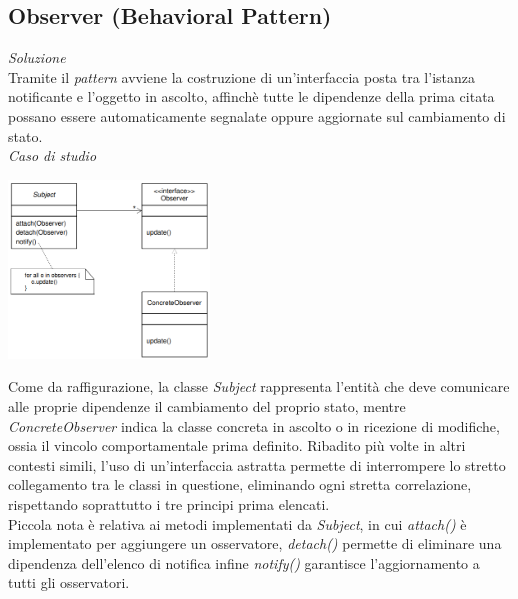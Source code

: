 \documentclass{article}
\begin{document}
\subsection*{Observer (Behavioral Pattern)}
\large
\textit{Soluzione}\\
Tramite il \textit{pattern} avviene la costruzione di un'interfaccia posta tra l'istanza notificante e l'oggetto in ascolto, affinchè tutte le dipendenze della prima citata possano essere automaticamente segnalate oppure aggiornate sul cambiamento di stato.\vspace*{14pt}\\
\textit{Caso di studio}\\
\begin{center}
    \includegraphics[width=0.4\textwidth]{foto 3.png}
\end{center}
Come da raffigurazione, la classe \textit{Subject} rappresenta l'entità che deve comunicare alle proprie dipendenze il cambiamento del proprio stato, mentre \textit{ConcreteObserver} indica la classe concreta in ascolto o in ricezione di modifiche, ossia il vincolo comportamentale prima definito. Ribadito più volte in altri contesti simili, l'uso di un'interfaccia astratta permette di interrompere lo stretto collegamento tra le classi in questione, eliminando ogni stretta correlazione, rispettando soprattutto i tre principi prima elencati.\vspace*{7pt}\\
Piccola nota è relativa ai metodi implementati da \textit{Subject}, in cui \textit{attach()} è implementato per aggiungere un osservatore, \textit{detach()} permette di eliminare una dipendenza dell'elenco di notifica infine \textit{notify()} garantisce l'aggiornamento a tutti gli osservatori. 
\end{document}
